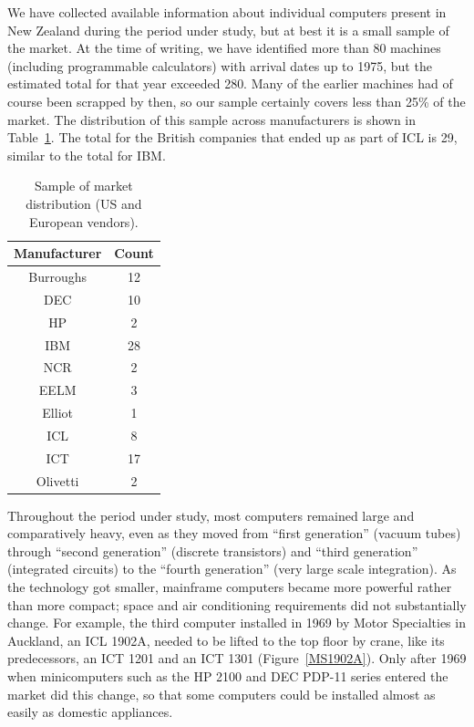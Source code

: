 \documentclass{IEEEcsmag}
\begin{document}
We have collected available information about individual computers present in New Zealand during the period under study, but at best it is a small sample of the market. At the time of writing, we have identified more than 80 machines (including programmable calculators) with arrival dates up to 1975, but the estimated total for that year exceeded 280. Many of the earlier machines had of course been scrapped by then, so our sample certainly covers less than 25\% of the market. The distribution of this sample across manufacturers is shown in Table~\ref{TotalManuf}. The total for the British companies that ended up as part of ICL is 29, similar to the total for IBM.

\begin{table}[h]
\begin{center}
\begin{tabular}{ |c|c| } 
 \hline
Manufacturer & Count\\ 
\hline
Burroughs & 12\\
DEC & 10\\
HP & 2\\
IBM & 28\\
NCR & 2\\
\hline
EELM & 3\\
Elliot & 1\\
ICL & 8\\
ICT & 17\\ 
Olivetti & 2\\
\hline
\end{tabular}
\vspace{1ex}
\caption{\label{TotalManuf}Sample of market distribution (US and European vendors).}
\end{center}
\end{table}

Throughout the period under study, most computers remained large and comparatively heavy, even as they moved from “first generation” (vacuum tubes) through “second generation” (discrete transistors) and “third generation” (integrated circuits) to the “fourth generation” (very large scale integration). As the technology got smaller, mainframe computers became more powerful rather than more compact; space and air conditioning requirements did not substantially change. For example, the third computer installed in 1969 by Motor Specialties in Auckland, an ICL 1902A, needed to be lifted to the top floor by crane, like its predecessors, an ICT 1201 and an ICT 1301 (Figure~\ref{MS1902A}). Only after 1969 when minicomputers such as the HP 2100 and DEC PDP-11 series entered the market did this change, so that some computers could be installed almost as easily as domestic appliances.
\end{document}
